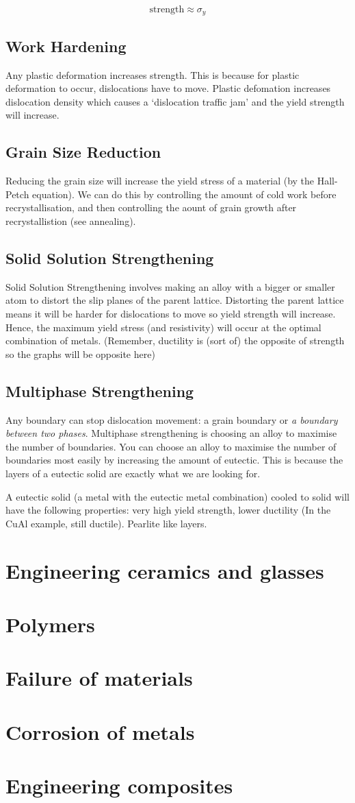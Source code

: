 \documentclass[12pt]{article}
\begin{document}
\begin{equation*}
  \text{strength} \approx \sigma_y
\end{equation*}

\subsection{Work Hardening}
Any plastic deformation increases strength.
This is because for plastic deformation to occur, dislocations have to move. 
Plastic defomation increases dislocation density which causes a `dislocation traffic jam' and the yield strength will increase.

\subsection{Grain Size Reduction}
Reducing the grain size will increase the yield stress of a material (by the Hall-Petch equation).
We can do this by controlling the amount of cold work before recrystallisation, and then controlling the aount of grain growth after recrystallistion (see annealing).

\subsection{Solid Solution Strengthening}
Solid Solution Strengthening involves making an alloy with a bigger or smaller atom to distort the slip planes of the parent lattice.
Distorting the parent lattice means it will be harder for dislocations to move so yield strength will increase.
Hence, the maximum yield stress (and resistivity) will occur at the optimal combination of metals.
(Remember, ductility is (sort of) the opposite of strength so the graphs will be opposite here)

\subsection{Multiphase Strengthening}
Any boundary can stop dislocation movement: a grain boundary or \textit{a boundary between two phases}. 
Multiphase strengthening is choosing an alloy to maximise the number of boundaries.
You can choose an alloy to maximise the number of boundaries most easily by increasing the amount of eutectic. 
This is because the layers of a eutectic solid are exactly what we are looking for.

A eutectic solid (a metal with the eutectic metal combination) cooled to solid will have the following properties:
very high yield strength, lower ductility (In the CuAl example, still ductile). Pearlite like layers.

\section{Engineering ceramics and glasses}
\section{Polymers}
\section{Failure of materials}
\section{Corrosion of metals}
\section{Engineering composites}
\end{document}
